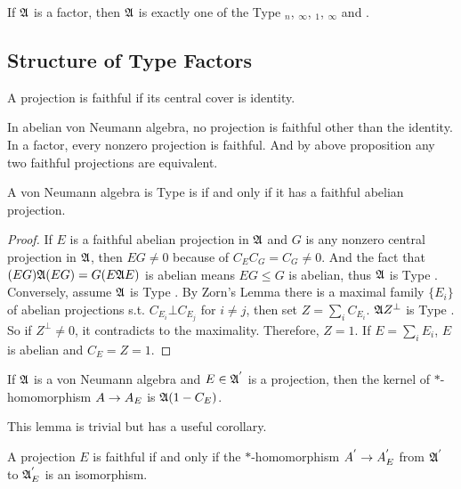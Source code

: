 \begin{cor}
	If $\mathfrak{A}$ is a factor, then $\mathfrak{A}$ is exactly one of the Type $_n$, $_{\infty}$, $_1$, $_{\infty}$ and .
\end{cor}

\subsection{Structure of Type \texorpdfstring{}{I} Factors}

\begin{defn}
	A projection is faithful if its central cover is identity.
\end{defn}
\begin{rem}
	In abelian von Neumann algebra, no projection is faithful other than the identity. In a factor, every nonzero projection is faithful. And by above proposition any two faithful projections are equivalent.
\end{rem}

\begin{prop}
	A von Neumann algebra is Type  is if and only if it has a faithful abelian projection.
\end{prop}
\begin{proof}
	If $E$ is a faithful abelian projection in $\mathfrak{A}$ and $G$ is any nonzero central projection in $\mathfrak{A}$, then $EG \neq 0$ because of $C_EC_G = C_G \neq 0$. And the fact that $(EG)\mathfrak{A} (EG) = G (E\mathfrak{A} E)$ is abelian means $EG \leqslant G$ is abelian, thus $\mathfrak{A}$ is Type .\\
	Conversely, assume $\mathfrak{A}$ is Type . By Zorn's Lemma there is a maximal family $\{E_i\}$ of abelian projections s.t. $C_{E_i} \bot C_{E_j}$ for $i \neq j$, then set $Z = \sum_i C_{E_i}$. $\mathfrak{A} Z^{\bot}$ is Type . So if $Z^{\bot} \neq 0$, it contradicts to the maximality. Therefore, $Z = 1$. If $E = \sum_i E_i$, $E$ is abelian and $C_E = Z = 1$.
\end{proof}

\begin{lem}
	If $\mathfrak{A}$ is a von Neumann algebra and $E \in \mathfrak{A}^{'}$ is a projection, then the kernel of $*$-homomorphism $A \rightarrow A_E$ is $\mathfrak{A} (1-C_E)$.
\end{lem}
This lemma is trivial but has a useful corollary.
\begin{cor}
	A projection $E$ is faithful if and only if the $*$-homomorphism $A^{'} \rightarrow A_E^{'}$ from $\mathfrak{A}^{'}$ to $\mathfrak{A}_E^{'}$ is an isomorphism.
\end{cor}

